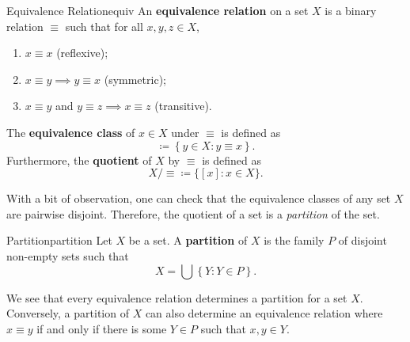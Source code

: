 \documentclass[math]{amznotes}
\theoremstyle{remark}
\begin{document}
\begin{dfnbox}{Equivalence Relation}{equiv}
    An {\color{red} \textbf{equivalence relation}} on a set $X$ is a binary relation $\equiv$ such that for all $x, y, z \in X$,
    \begin{enumerate}
        \item $x \equiv x$ (reflexive);
        \item $x \equiv y \implies y \equiv x$ (symmetric);
        \item $x \equiv y$ and $y \equiv z \implies x \equiv z$ (transitive).
    \end{enumerate}
    The {\color{red} \textbf{equivalence class}} of $x \in X$ under $\equiv$ is defined as
    \begin{equation*}
        [x] \coloneqq \left\{y \in X \colon y \equiv x \right\}.
    \end{equation*}
    Furthermore, the {\color{red} \textbf{quotient}} of $X$ by $\equiv$ is defined as 
    \begin{equation*}
        X/\equiv \coloneqq \bigl\{[x] \colon x \in X\bigr\}.
    \end{equation*}
\end{dfnbox}
With a bit of observation, one can check that the equivalence classes of any set $X$ are pairwise disjoint. Therefore, the quotient of a set is a \textit{partition} of the set.
\begin{dfnbox}{Partition}{partition}
    Let $X$ be a set. A {\color{red} \textbf{partition}} of $X$ is the family $P$ of disjoint non-empty sets such that
    \begin{equation*}
        X = \bigcup \left\{Y \colon Y \in P\right\}.
    \end{equation*}
\end{dfnbox}
We see that every equivalence relation determines a partition for a set $X$. Conversely, a partition of $X$ can also determine an equivalence relation where $x \equiv y$ if and only if there is some $Y \in P$ such that $x, y \in Y$.
\end{document}
